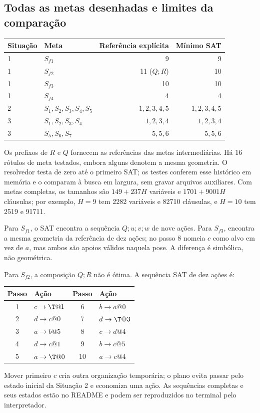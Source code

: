 \documentclass[11pt,a4paper]{article}
\begin{document}
\subsection{Todas as metas desenhadas e limites da comparação}
\begin{center}\small
\begin{tabular}{@{}llrr@{}}\toprule
Situação & Meta & Referência explícita & Mínimo SAT\\\midrule
1 & $S_{f1}$ & 9 & 9\\
1 & $S_{f2}$ & 11 ($Q;R$) & 10\\
1 & $S_{f3}$ & 10 & 10\\
1 & $S_{f4}$ & 4 & 4\\\midrule
2 & $S_1,S_2,S_3,S_4,S_5$ & $1,2,3,4,5$ & $1,2,3,4,5$\\\midrule
3 & $S_1,S_2,S_3,S_4$ & $1,2,3,4$ & $1,2,3,4$\\
3 & $S_5,S_6,S_7$ & $5,5,6$ & $5,5,6$\\\bottomrule
\end{tabular}\end{center}
Os prefixos de $R$ e $Q$ fornecem as referências das metas intermediárias. Há 16 rótulos de meta testados, embora alguns denotem a mesma geometria. O resolvedor testa de zero até o primeiro SAT; os testes conferem esse histórico em memória e o comparam à busca em largura, sem gravar arquivos auxiliares. Com metas completas, os tamanhos são $149+237H$ variáveis e $1701+9001H$ cláusulas; por exemplo, $H=9$ tem 2282 variáveis e 82710 cláusulas, e $H=10$ tem 2519 e 91711.

Para $S_{f1}$, o SAT encontra a sequência $Q;u;v;w$ de nove ações. Para $S_{f3}$, encontra a mesma geometria da referência de dez ações; no passo 8 nomeia $c$ como alvo em vez de $a$, mas ambos são apoios válidos naquela pose. A diferença é simbólica, não geométrica.

Para $S_{f2}$, a composição $Q;R$ não é ótima. A sequência SAT de dez ações é:
\begin{center}\small
\begin{tabular}{@{}clcl@{}}\toprule
Passo & Ação & Passo & Ação\\\midrule
1 & $c\to\T@1$ & 6 & $b\to a@0$\\
2 & $d\to c@0$ & 7 & $d\to\T@3$\\
3 & $a\to b@5$ & 8 & $c\to d@4$\\
4 & $d\to c@1$ & 9 & $b\to c@5$\\
5 & $a\to\T@0$ & 10 & $a\to c@4$\\\bottomrule
\end{tabular}\end{center}
Mover primeiro $c$ cria outra organização temporária; o plano evita passar pelo estado inicial da Situação 2 e economiza uma ação. As sequências completas e seus estados estão no README e podem ser reproduzidos no terminal pelo interpretador.
\end{document}
